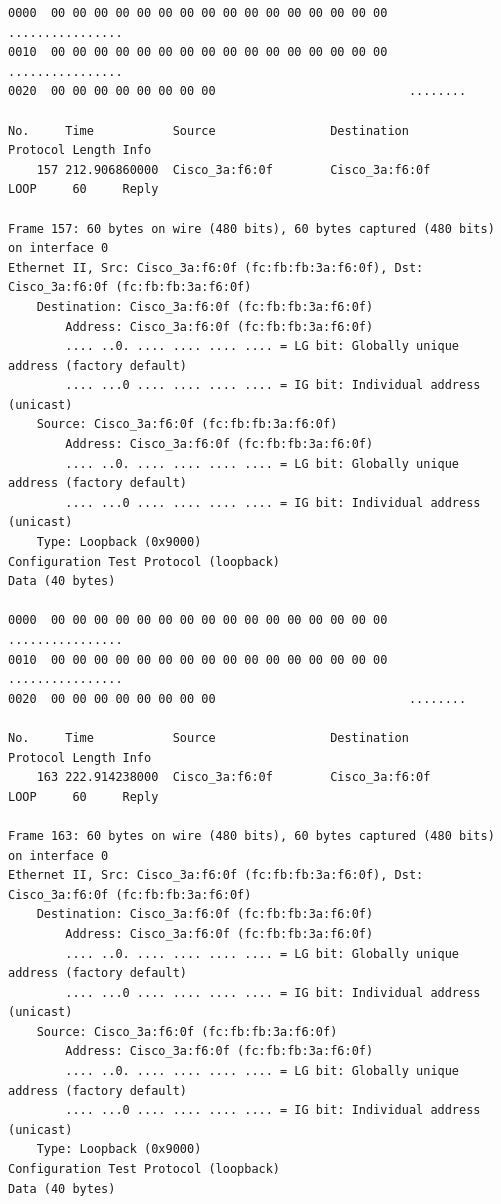 \documentclass[a4paper,11pt]{article}
\begin{document}
\begin{lstlisting}
0000  00 00 00 00 00 00 00 00 00 00 00 00 00 00 00 00   ................
0010  00 00 00 00 00 00 00 00 00 00 00 00 00 00 00 00   ................
0020  00 00 00 00 00 00 00 00                           ........

No.     Time           Source                Destination           Protocol Length Info
    157 212.906860000  Cisco_3a:f6:0f        Cisco_3a:f6:0f        LOOP     60     Reply

Frame 157: 60 bytes on wire (480 bits), 60 bytes captured (480 bits) on interface 0
Ethernet II, Src: Cisco_3a:f6:0f (fc:fb:fb:3a:f6:0f), Dst: Cisco_3a:f6:0f (fc:fb:fb:3a:f6:0f)
    Destination: Cisco_3a:f6:0f (fc:fb:fb:3a:f6:0f)
        Address: Cisco_3a:f6:0f (fc:fb:fb:3a:f6:0f)
        .... ..0. .... .... .... .... = LG bit: Globally unique address (factory default)
        .... ...0 .... .... .... .... = IG bit: Individual address (unicast)
    Source: Cisco_3a:f6:0f (fc:fb:fb:3a:f6:0f)
        Address: Cisco_3a:f6:0f (fc:fb:fb:3a:f6:0f)
        .... ..0. .... .... .... .... = LG bit: Globally unique address (factory default)
        .... ...0 .... .... .... .... = IG bit: Individual address (unicast)
    Type: Loopback (0x9000)
Configuration Test Protocol (loopback)
Data (40 bytes)

0000  00 00 00 00 00 00 00 00 00 00 00 00 00 00 00 00   ................
0010  00 00 00 00 00 00 00 00 00 00 00 00 00 00 00 00   ................
0020  00 00 00 00 00 00 00 00                           ........

No.     Time           Source                Destination           Protocol Length Info
    163 222.914238000  Cisco_3a:f6:0f        Cisco_3a:f6:0f        LOOP     60     Reply

Frame 163: 60 bytes on wire (480 bits), 60 bytes captured (480 bits) on interface 0
Ethernet II, Src: Cisco_3a:f6:0f (fc:fb:fb:3a:f6:0f), Dst: Cisco_3a:f6:0f (fc:fb:fb:3a:f6:0f)
    Destination: Cisco_3a:f6:0f (fc:fb:fb:3a:f6:0f)
        Address: Cisco_3a:f6:0f (fc:fb:fb:3a:f6:0f)
        .... ..0. .... .... .... .... = LG bit: Globally unique address (factory default)
        .... ...0 .... .... .... .... = IG bit: Individual address (unicast)
    Source: Cisco_3a:f6:0f (fc:fb:fb:3a:f6:0f)
        Address: Cisco_3a:f6:0f (fc:fb:fb:3a:f6:0f)
        .... ..0. .... .... .... .... = LG bit: Globally unique address (factory default)
        .... ...0 .... .... .... .... = IG bit: Individual address (unicast)
    Type: Loopback (0x9000)
Configuration Test Protocol (loopback)
Data (40 bytes)


\end{lstlisting}
\end{document}
